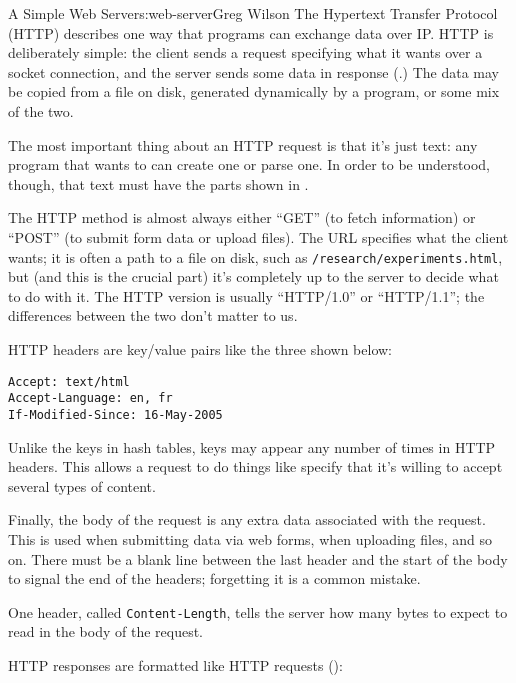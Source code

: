 \begin{aosachapter}{A Simple Web Server}{s:web-server}{Greg Wilson}
The Hypertext Transfer Protocol (HTTP) describes one way that programs
can exchange data over IP. HTTP is deliberately simple: the client sends
a request specifying what it wants over a socket connection, and the
server sends some data in response (.)
The data may be copied from a file on disk, generated dynamically by a
program, or some mix of the two.


The most important thing about an HTTP request is that it's just text:
any program that wants to can create one or parse one. In order to be
understood, though, that text must have the parts shown in
.


The HTTP method is almost always either ``GET'' (to fetch information)
or ``POST'' (to submit form data or upload files). The URL specifies
what the client wants; it is often a path to a file on disk, such as
\texttt{/research/experiments.html}, but (and this is the crucial part)
it's completely up to the server to decide what to do with it. The HTTP
version is usually ``HTTP/1.0'' or ``HTTP/1.1''; the differences between
the two don't matter to us.

HTTP headers are key/value pairs like the three shown below:

\begin{verbatim}
Accept: text/html
Accept-Language: en, fr
If-Modified-Since: 16-May-2005
\end{verbatim}

Unlike the keys in hash tables, keys may appear any number of times in
HTTP headers. This allows a request to do things like specify that it's
willing to accept several types of content.

Finally, the body of the request is any extra data associated with the
request. This is used when submitting data via web forms, when uploading
files, and so on. There must be a blank line between the last header and
the start of the body to signal the end of the headers; forgetting it is
a common mistake.

One header, called \texttt{Content-Length}, tells the server how many
bytes to expect to read in the body of the request.

HTTP responses are formatted like HTTP requests
():


\end{aosachapter}
